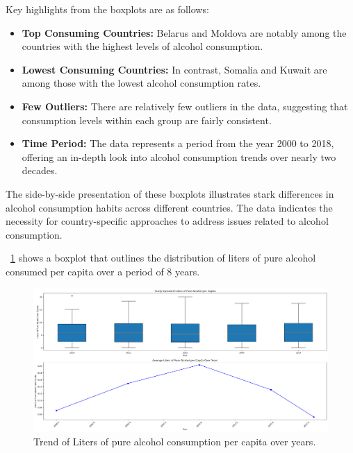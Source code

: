             Key highlights from the boxplots are as follows:

            \begin{itemize}
                \item \textbf{Top Consuming Countries:} Belarus and Moldova are notably among the countries with the highest levels of alcohol consumption.

                \item \textbf{Lowest Consuming Countries:} In contrast, Somalia and Kuwait are among those with the lowest alcohol consumption rates.

                \item \textbf{Few Outliers:} There are relatively few outliers in the data, suggesting that consumption levels within each group are fairly consistent.

                \item \textbf{Time Period:} The data represents a period from the year 2000 to 2018, offering an in-depth look into alcohol consumption trends over nearly two decades.
            \end{itemize}

            The side-by-side presentation of these boxplots illustrates stark differences in alcohol consumption habits across different countries. The data indicates the necessity for country-specific approaches to address issues related to alcohol consumption.


            \figurename~\ref{fig:du-alcohol-trend-years} shows a boxplot that outlines the distribution of liters of pure alcohol consumed per capita over a period of 8 years.

            \begin{figure}[H]
                \centering
                \includegraphics[scale=0.3]{images/du_alcohol_li_of_pu_al_pe_ca_y_trend}
                \caption{Trend of Liters of pure alcohol consumption per capita over years.}
                \label{fig:du-alcohol-trend-years}
            \end{figure}


